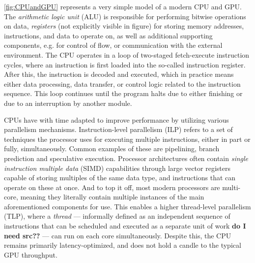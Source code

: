 \documentclass[english,12pt,a4paper,pdftex,sci,utf8]{aaltothesis}
\begin{document}
 \cref{fig:CPUandGPU} represents a very simple model of a modern CPU and GPU. The \emph{arithmetic logic unit} (ALU) is responsible for performing bitwise operations on data, \emph{registers} (not explicitly visible in figure) for storing memory addresses, instructions, and data to operate on, as well as additional supporting components, e.g. for control of flow, or communication with the external environment. The CPU operates in a loop of two-staged fetch-execute instruction cycles, where an instruction is first loaded into the so-called instruction register. After this, the instruction is decoded and executed, which in practice means either data processing, data transfer, or control logic related to the instruction sequence. This loop continues until the program halts due to either finishing or due to an interruption by another module.\cite{stallings2011operating}

CPUs have with time adapted to improve performance by utilizing various parallelism mechanisms. Instruction-level parallelism (ILP) refers to a set of techniques the processor uses for executing multiple instructions, either in part or fully, simultaneously. Common examples of these are pipelining, branch prediction and speculative execution. Processor architectures often contain \emph{single instruction multiple data} (SIMD) capabilities through large vector registers capable of storing multiples of the same data type, and instructions that can operate on these at once. And to top it off, most modern processors are multi-core, meaning they literally contain multiple instances of the main aforementioned components for use. This enables a higher thread-level parallelism (TLP), where a \emph{thread} — informally defined as an independent sequence of instructions that can be scheduled and executed as a separate unit of work \textbf{do I need src??} — can run on each core simultaneously. Despite this, the CPU remains primarily latency-optimized, and does not hold a candle to the typical GPU throughput. \cite{hennessy2011computer}
\end{document}
